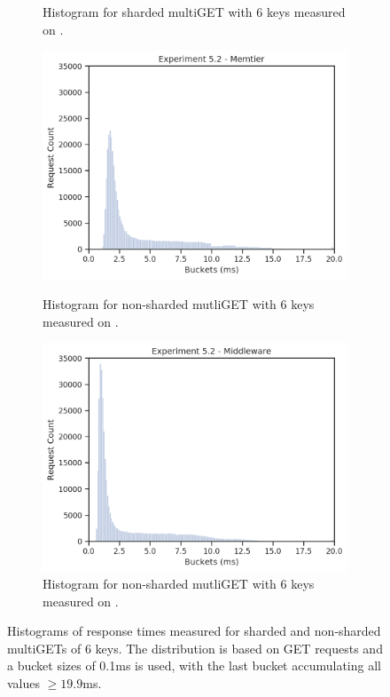 \begin{figure}
\begin{subfigure}[t!]{0.48\textwidth}
                \caption{Histogram for sharded multiGET with 6 keys measured on \mw.\label{fig:histogram_sharded_mw}}
            \end{subfigure}
            \begin{subfigure}[t!]{0.48\textwidth}
                \centering
                \includegraphics[width=\textwidth]{../data_analysis/figures/5-2_mt_histogram.png}
                \caption{Histogram for non-sharded mutliGET with 6 keys measured on
                \cli.\label{fig:histogram_nonsharded_mt}}
                \includegraphics[width=\textwidth]{../data_analysis/figures/5-2_mw_histogram.png}
                \caption{Histogram for non-sharded mutliGET with 6 keys measured on
                \mw.\label{fig:histogram_nonsharded_nw}}
            \end{subfigure}
            \caption{Histograms of response times measured for sharded and non-sharded multiGETs of 6 keys. The
                     distribution is based on GET requests and a bucket sizes of 0.1ms is used, with the last
                     bucket accumulating all values $\geq19.9$ms.\label{fig:histograms}}
        \end{figure}

